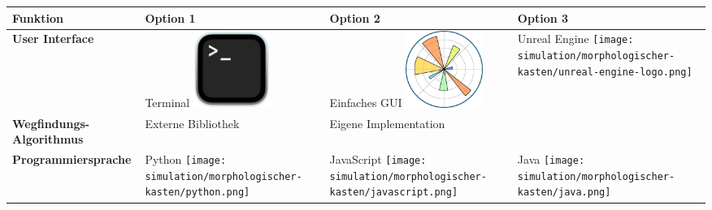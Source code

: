 \documentclass[../main.tex]{subfiles}
\begin{document}

\begin{table}[htbp!]
    \centering
    \begin{tabularx}{\textwidth}{| X | Y | Y | Y |}
        \hline

        \textbf{Funktion} & \textbf{Option 1} & \textbf{Option 2} & \textbf{Option 3} \\ \hline
        
        \textbf{User Interface} &     
        Terminal \newline
        \includegraphics[width=2.5cm]{img/simulation/morphologischer-kasten/terminal.png}
        &
        Einfaches GUI \newline
        \includegraphics[width=2.5cm]{img/simulation/morphologischer-kasten/simple-gui.png}
        &
        Unreal Engine \newline
        \texttt{[image: simulation/morphologischer-kasten/unreal-engine-logo.png]}
        \\ \hline
        
        \textbf{Wegfindungs-Algorithmus}  &
        Externe Bibliothek &
        Eigene Implementation &
        \\ \hline
        
        \textbf{Programmiersprache}      &
        Python \newline
        \texttt{[image: simulation/morphologischer-kasten/python.png]} 
        &
        JavaScript \newline
        \texttt{[image: simulation/morphologischer-kasten/javascript.png]}
        &
        Java \newline
        \texttt{[image: simulation/morphologischer-kasten/java.png]}
        \\ \hline
        

\end{tabularx}
\end{table}
\end{document}
